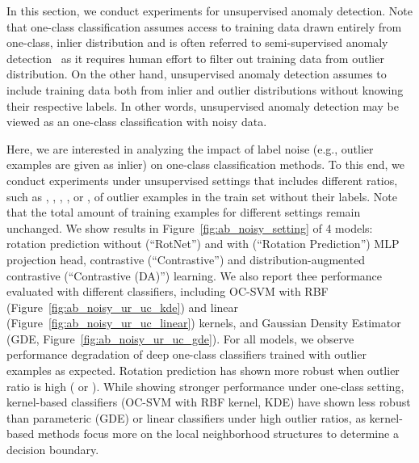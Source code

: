 \documentclass{article} \usepackage{iclr2021_conference,times}
\begin{document}
In this section, we conduct experiments for unsupervised anomaly detection. Note that one-class classification assumes access to training data drawn entirely from one-class, inlier distribution and is often referred to semi-supervised anomaly detection~\citep{chandola2009anomaly} as it requires human effort to filter out training data from outlier distribution. On the other hand, unsupervised anomaly detection assumes to include training data both from inlier and outlier distributions without knowing their respective labels. In other words, unsupervised anomaly detection may be viewed as an one-class classification with noisy data.

Here, we are interested in analyzing the impact of label noise (e.g., outlier examples are given as inlier) on one-class classification methods. To this end, we conduct experiments under unsupervised settings that includes different ratios, such as , , , , or , of outlier examples in the train set without their labels. Note that the total amount of training examples for different settings remain unchanged. We show results in Figure~\ref{fig:ab_noisy_setting} of 4 models: rotation prediction without (``RotNet'') and with (``Rotation Prediction'') MLP projection head, contrastive (``Contrastive'') and distribution-augmented contrastive (``Contrastive (DA)'') learning. We also report thee performance evaluated with different classifiers, including OC-SVM with RBF (Figure~\ref{fig:ab_noisy_ur_uc_kde}) and linear (Figure~\ref{fig:ab_noisy_ur_uc_linear}) kernels, and Gaussian Density Estimator (GDE, Figure~\ref{fig:ab_noisy_ur_uc_gde}). For all models, we observe performance degradation of deep one-class classifiers trained with outlier examples as expected. Rotation prediction has shown more robust when outlier ratio is high ( or ). While showing stronger performance under one-class setting, kernel-based classifiers (OC-SVM with RBF kernel, KDE) have shown less robust than parameteric (GDE) or linear classifiers under high outlier ratios, as kernel-based methods focus more on the local neighborhood structures to determine a decision boundary.
\end{document}

